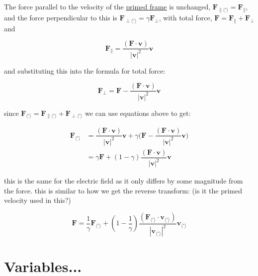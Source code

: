 The force parallel to the velocity of the \hyperlink{def-Primed-Frame}{primed frame} is unchanged, $\mathbf{F}_{\parallel \langle ' \rangle} =\mathbf{F}_{\parallel}$, and the force perpendicular to this is $\mathbf{F}_{\perp \langle ' \rangle} =\gamma \mathbf{F}_{\perp}$, with total force, $\mathbf{F}=\mathbf{F}_{\parallel}+\mathbf{F}_{\perp}$ and

\begin{equation}
	\mathbf{F}_{\parallel} = \dfrac{(\mathbf{F}\cdot\mathbf{v})}{|\mathbf{v}|^2}\mathbf{v}
\end{equation}

and substituting this into the formula for total force:

\begin{equation}
	\mathbf{F}_{\perp} = \mathbf{F}-\dfrac{(\mathbf{F}\cdot\mathbf{v})}{|\mathbf{v}|^2}\mathbf{v}
\end{equation}

since $\mathbf{F}_{\langle ' \rangle} =\mathbf{F}_{\parallel \langle ' \rangle} +\mathbf{F}_{\perp\langle ' \rangle}$ we can use equations above to get:

\begin{equation}
	\begin{split}
		\mathbf{F}_{\langle ' \rangle} & = \dfrac{(\mathbf{F}\cdot\mathbf{v})}{|\mathbf{v}|^2}\mathbf{v} + \gamma\bigg(\mathbf{F}-\dfrac{(\mathbf{F}\cdot\mathbf{v})}{|\mathbf{v}|^2}\mathbf{v}\bigg) \\
		                               & = \gamma\mathbf{F} + (1-\gamma)\dfrac{(\mathbf{F}\cdot\mathbf{v})}{|\mathbf{v}|^2}\mathbf{v}
	\end{split}
\end{equation}

this is the same for the electric field as it only differs by some magnitude from the force.\newline
this is similar to how we get the reverse transform: (is it the primed velocity used in this?)

\begin{equation}
	\mathbf{F} = \dfrac{1}{\gamma}\mathbf{F}_{\langle ' \rangle} + (1-\dfrac{1}{\gamma})\dfrac{(\mathbf{F}_{\langle ' \rangle} \cdot\mathbf{v}_{\langle ' \rangle} )}{|\mathbf{v}_{\langle ' \rangle} |^2}\mathbf{v}_{\langle ' \rangle}
\end{equation}

\section{Variables...}

